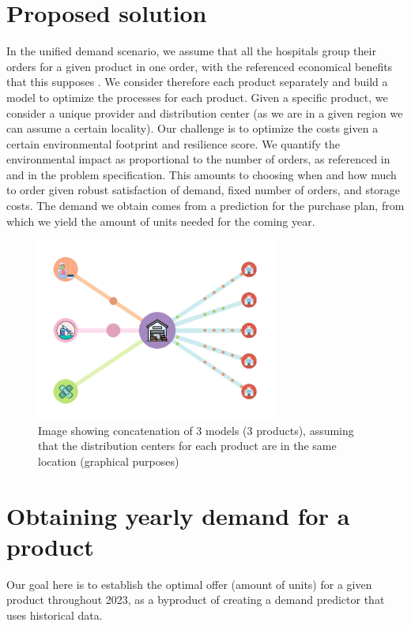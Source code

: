 \documentclass[11pt,twocolumn]{article}
\begin{document}
\section{Proposed solution}\label{sec3}
In the unified demand scenario, we assume that all the hospitals group their orders for a given product in one order, with the referenced economical benefits that this supposes \cite{key2}. We consider therefore each product separately and build a model to optimize the processes for each product. Given a specific product, we consider a unique provider and distribution center (as we are in a given region we can assume a certain locality). Our challenge is to optimize the costs given a certain environmental footprint and resilience score. We quantify the environmental impact as proportional to the number of orders, as referenced in \cite{key1} and in the problem specification. This amounts to choosing when and how much to order given robust satisfaction of demand, fixed number of orders, and storage costs.
The demand we obtain comes from a prediction for the purchase plan, from which we yield the amount of units needed for the coming year.

\begin{figure}
	\centering
	\includegraphics[width=8cm]{WhatsApp Image 2023-11-12 at 01.28.21.jpeg}
	\caption{Image showing concatenation of 3 models (3 products), assuming that the distribution centers for each product are in the same location (graphical purposes)}
	\label{fig:enter-label}
\end{figure}

\section{Obtaining yearly demand for a product}
Our goal here is to establish the optimal offer (amount of units) for a given product throughout 2023, as a byproduct of creating a demand predictor that uses historical data.
\end{document}
